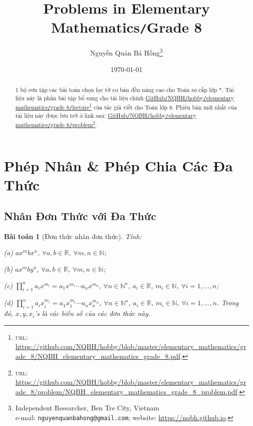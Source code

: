 \documentclass{article}
\title{Problems in Elementary Mathematics\texttt{/}Grade 8}
\author{Nguyễn Quản Bá Hồng\footnote{Independent Researcher, Ben Tre City, Vietnam\\e-mail: \texttt{nguyenquanbahong@gmail.com}; website: \url{https://nqbh.github.io}.}}
\date{\today}
\numberwithin{equation}{section}
\newtheorem{baitoan}{Bài toán}[section]
\begin{document}
\maketitle
\begin{abstract}
	1 bộ sưu tập các bài toán chọn lọc từ cơ bản đến nâng cao cho Toán sơ cấp lớp *. Tài liệu này là phần bài tập bổ sung cho tài liệu chính \href{https://github.com/NQBH/hobby/blob/master/elementary_mathematics/grade_8/NQBH_elementary_mathematics_grade_8.pdf}{GitHub\texttt{/}NQBH\texttt{/}hobby\texttt{/}elementary mathematics\texttt{/}grade 8\texttt{/}lecture}\footnote{\textsc{url}: \url{https://github.com/NQBH/hobby/blob/master/elementary_mathematics/grade_8/NQBH_elementary_mathematics_grade_8.pdf}.} của tác giả viết cho Toán lớp 8. Phiên bản mới nhất của tài liệu này được lưu trữ ở link sau: \href{https://github.com/NQBH/hobby/blob/master/elementary_mathematics/grade_8/problem/NQBH_elementary_mathematics_grade_8_problem.pdf}{GitHub\texttt{/}NQBH\texttt{/}hobby\texttt{/}elementary mathematics\texttt{/}grade 8\texttt{/}problem}\footnote{\textsc{url}: \url{https://github.com/NQBH/hobby/blob/master/elementary_mathematics/grade_8/problem/NQBH_elementary_mathematics_grade_8_problem.pdf}.}.
\end{abstract}
\tableofcontents
\newpage


\section{Phép Nhân \& Phép Chia Các Đa Thức}

\subsection{Nhân Đơn Thức với Đa Thức}

\begin{baitoan}[Đơn thức nhân đơn thức]
	Tính:
	\begin{enumerate*}
		\item[(a)] $ax^mbx^n$, $\forall a,b\in\mathbb{R}$, $\forall m,n\in\mathbb{N}$;
		\item[(b)] $ax^mby^n$, $\forall a,b\in\mathbb{R}$, $\forall m,n\in\mathbb{N}$;
		\item[(c)] $\prod_{i=1}^n a_ix^{m_i} = a_1x^{m_1}\cdots a_nx^{m_n}$, $\forall n\in\mathbb{N}^\star$, $a_i\in\mathbb{R}$, $m_i\in\mathbb{N}$, $\forall i = 1,\ldots,n$;
		\item[(d)] $\prod_{i=1}^n a_ix_i^{m_i} = a_1x_1^{m_1}\cdots a_nx_n^{m_n}$, $\forall n\in\mathbb{N}^\star$, $a_i\in\mathbb{R}$, $m_i\in\mathbb{N}$, $\forall i = 1,\ldots,n$. Trong đó, $x,y,x_i$'s là các biến số của các đơn thức này.
	\end{enumerate*}
\end{baitoan}
\end{document}
